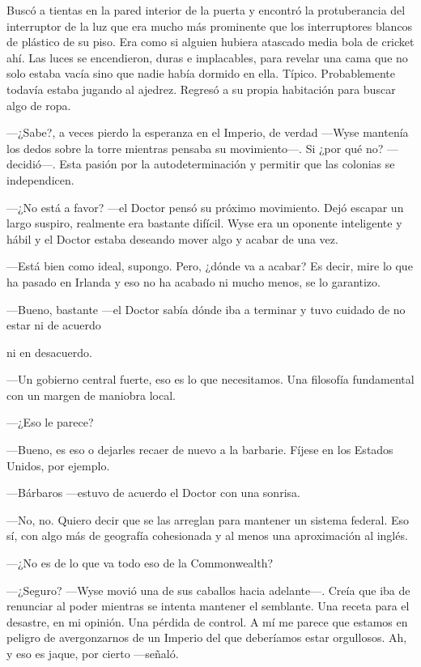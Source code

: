 {Buscó a tientas en la pared interior de la puerta y encontró la
	protuberancia del interruptor de la luz que era mucho más prominente que
	los interruptores blancos de plástico de su piso. Era como si alguien
	hubiera atascado media bola de cricket ahí. Las luces se encendieron,
	duras e implacables, para revelar una cama que no solo estaba vacía sino
	que nadie había dormido en ella. Típico. Probablemente todavía estaba
	jugando al ajedrez. Regresó a su propia habitación para buscar algo de
ropa.}

\mbox{}

{---¿Sabe?, a veces pierdo la esperanza en el Imperio, de verdad ---Wyse
	mantenía los dedos sobre la torre mientras pensaba su movimiento---. Si
	¿por qué no? ---decidió---. Esta pasión por la autodeterminación y
permitir que las colonias se independicen.}

{---¿No está a favor? ---el Doctor pensó su próximo movimiento. Dejó
	escapar un largo suspiro, realmente era bastante difícil. Wyse era un
	oponente inteligente y hábil y el Doctor estaba deseando mover algo y
acabar de una vez.}

{---Está bien como ideal, supongo. Pero, ¿dónde va a acabar? Es decir,
	mire lo que ha pasado en Irlanda y eso no ha acabado ni mucho menos, se
lo garantizo.}

{---Bueno, bastante ---el Doctor sabía dónde iba a terminar y tuvo
cuidado de no estar ni de acuerdo}

{ni en desacuerdo.}

{---Un gobierno central fuerte, eso es lo que necesitamos. Una filosofía
fundamental con un margen de maniobra local.}

{---¿Eso le parece?}

{---Bueno, es eso o dejarles recaer de nuevo a la barbarie. Fíjese en
los Estados Unidos, por ejemplo.}

{---Bárbaros ---estuvo de acuerdo el Doctor con una sonrisa.}

{---No, no. Quiero decir que se las arreglan para mantener un sistema
	federal. Eso sí, con algo más de geografía cohesionada y al menos una
aproximación al inglés.}

{---¿No es de lo que va todo eso de la Commonwealth?}

{---¿Seguro? ---Wyse movió una de sus caballos hacia adelante---. Creía
	que iba de renunciar al poder mientras se intenta mantener el semblante.
	Una receta para el desastre, en mi opinión. Una pérdida de control. A mí
	me parece que estamos en peligro de avergonzarnos de un Imperio del que
deberíamos estar orgullosos. Ah, y eso es jaque, por cierto ---señaló.}

